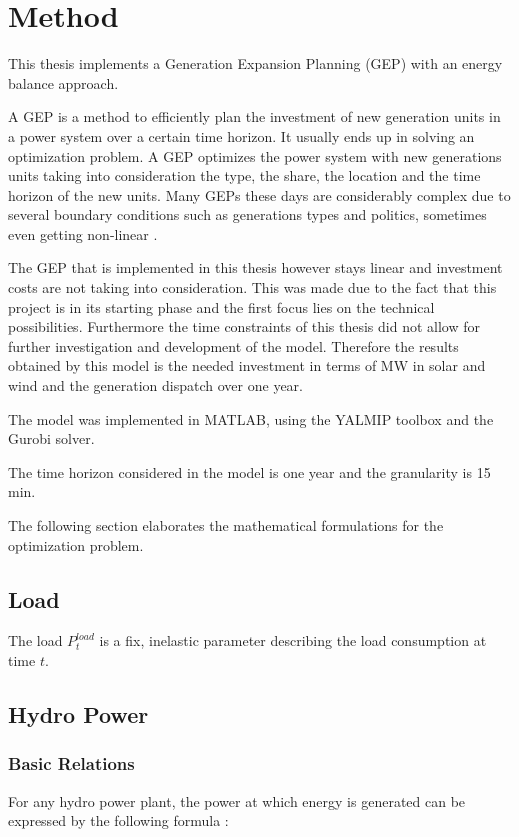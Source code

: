 \chapter{Method}

This thesis implements a Generation Expansion Planning (GEP) with an energy balance approach. 

A GEP is a method to efficiently plan the investment of new generation units in a power system over a certain time horizon. It usually ends up in solving an optimization problem. A GEP optimizes the power system with new generations units taking into consideration the type, the share, the location and the time horizon of the new units. Many GEPs these days are considerably complex due to several boundary conditions such as generations types and politics, sometimes even getting non-linear \cite{GEP}. 

The GEP that is implemented in this thesis however stays linear and investment costs are not taking into consideration. This was made due to the fact that this project is in its starting phase and the first focus lies on the technical possibilities. Furthermore the time constraints of this thesis did not allow for further investigation and development of the model. 
Therefore the results obtained by this model is the needed investment in terms of MW in solar and wind and the generation dispatch over one year. 

The model was implemented in MATLAB, using the YALMIP toolbox and the Gurobi solver. 

The time horizon considered in the model is one year and the granularity is 15\,min. 

The following section elaborates the mathematical formulations for the optimization problem. 

\section{Load}
The load $P^{load}_{t}$ is a fix, inelastic parameter describing the load consumption at time $t$.

\section{Hydro Power}

\subsection{Basic Relations}
For any hydro power plant, the power at which energy is generated can be expressed by the following formula \cite{hydropower}: 

